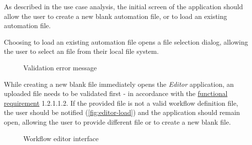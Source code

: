 As described in the use case analysis, the initial screen of the application should allow the user to create a new blank automation file, or to load an existing automation file.

Choosing to load an existing automation file opens a file selection dialog, allowing the user to select an file from their local file system.

\begin{figure}[!h]
    \begin{center}
    \end{center}
    \caption{Validation error message}\label{fig:editor-load}
\end{figure}
While creating a new blank file immediately opens the \textit{Editor} application, an uploaded file needs to be validated first - in accordance with the \hyperref[requirements]{functional requirement} 1.2.1.1.2.
If the provided file is not a valid workflow definition file, the user should be notified (\autoref{fig:editor-load}) and the application should remain open, allowing the user to provide different file or to create a new blank file.

\begin{figure}[h!]
    \begin{center}
    \end{center}
    \caption{Workflow editor interface} \label{fig:editor-workflow}
\end{figure}

